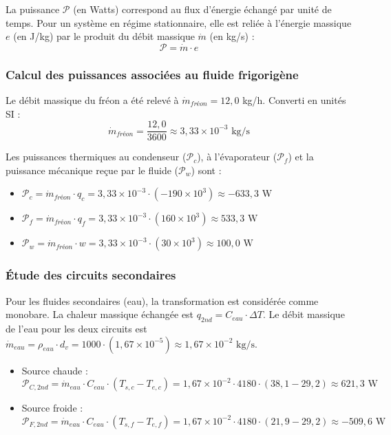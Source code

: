\documentclass[a4paper,10pt,french]{scrartcl}
\begin{document}
La puissance $\mathcal{P}$ (en Watts) correspond au flux d'énergie échangé par unité de temps. Pour un système en régime stationnaire, elle est reliée à l'énergie massique $e$ (en J/kg) par le produit du débit massique $\dot{m}$ (en kg/s) :
$$\mathcal{P} = \dot{m} \cdot e$$

\subsubsection{Calcul des puissances associées au fluide frigorigène}

Le débit massique du fréon a été relevé à $\dot{m}_{fréon} = 12,0$ kg/h. Converti en unités SI :
$$\dot{m}_{fréon} = \frac{12,0}{3600} \approx 3,33 \times 10^{-3} \text{ kg/s}$$

Les puissances thermiques au condenseur ($\mathcal{P}_c$), à l'évaporateur ($\mathcal{P}_f$) et la puissance mécanique reçue par le fluide ($\mathcal{P}_w$) sont :
\begin{itemize}
    \item $\mathcal{P}_c = \dot{m}_{fréon} \cdot q_c = 3,33 \times 10^{-3} \cdot (-190 \times 10^3) \approx -633,3 \text{ W}$
    \item $\mathcal{P}_f = \dot{m}_{fréon} \cdot q_f = 3,33 \times 10^{-3} \cdot (160 \times 10^3) \approx 533,3 \text{ W}$
    \item $\mathcal{P}_w = \dot{m}_{fréon} \cdot w = 3,33 \times 10^{-3} \cdot (30 \times 10^3) \approx 100,0 \text{ W}$
\end{itemize}

\subsubsection{Étude des circuits secondaires}

Pour les fluides secondaires (eau), la transformation est considérée comme monobare. La chaleur massique échangée est $q_{2nd} = C_{eau} \cdot \Delta T$.
Le débit massique de l'eau pour les deux circuits est $\dot{m}_{eau} = \rho_{eau} \cdot d_{v} = 1000 \cdot (1,67 \times 10^{-5}) \approx 1,67 \times 10^{-2} \text{ kg/s}$.

\begin{itemize}
    \item {Source chaude :}
    $$\mathcal{P}_{C,2nd} = \dot{m}_{eau} \cdot C_{eau} \cdot (T_{s,c} - T_{e,c}) = 1,67 \times 10^{-2} \cdot 4180 \cdot (38,1 - 29,2) \approx 621,3 \text{ W}$$
    
    \item {Source froide :}
    $$\mathcal{P}_{F,2nd} = \dot{m}_{eau} \cdot C_{eau} \cdot (T_{s,f} - T_{e,f}) = 1,67 \times 10^{-2} \cdot 4180 \cdot (21,9 - 29,2) \approx -509,6 \text{ W}$$
\end{itemize}
\end{document}
